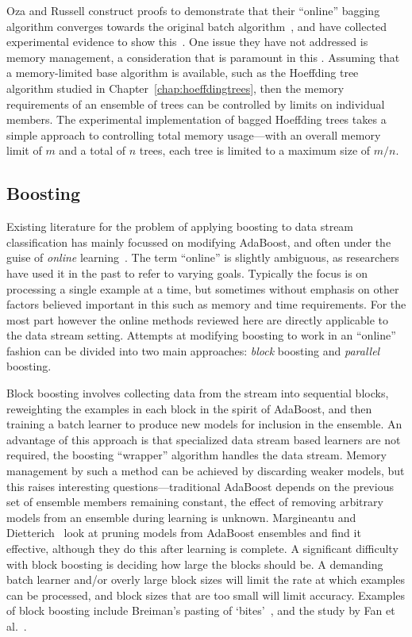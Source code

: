 Oza and Russell construct proofs to demonstrate that their ``online'' bagging algorithm converges towards the original batch algorithm~\cite{ozabagboost}, and have collected experimental evidence to show this~\cite{ozaexp}. One issue they have not addressed is memory management, a consideration that is paramount in this  \thesisc. Assuming that a memory-limited base algorithm is available, such as the Hoeffding tree algorithm studied in Chapter~\ref{chap:hoeffdingtrees}, then the memory requirements of an ensemble of trees can be controlled by limits on individual members. The experimental implementation of bagged Hoeffding trees takes a simple approach to controlling total memory usage---with an overall memory limit of $m$ and a total of $n$ trees, each tree is limited to a maximum size of $m/n$.


\subsection{Boosting} 
\label{sec:boostingstream}

Existing literature for the problem of applying boosting to data stream
classification has mainly focussed on modifying AdaBoost, and often under the guise of {\em online} learning~\cite{ozabagboost, fszboost}. 
The term ``online'' is slightly ambiguous, as researchers have used it in the past to refer to varying goals. Typically the focus is on processing a single example at a time, but sometimes without emphasis on other factors believed important in this \thesis  such as memory and time requirements.
For the most part however the online methods reviewed here are directly applicable to the data stream setting.
Attempts at modifying boosting to work in an ``online'' fashion can be
divided into two main approaches: {\em block} boosting and {\em parallel}
boosting.

Block boosting involves collecting data from the stream into sequential blocks,
reweighting the examples in each block in the spirit of AdaBoost, and then
training a batch learner to produce new models for inclusion in the
ensemble. An advantage of this approach is that specialized data stream
based learners are not required, the boosting ``wrapper'' algorithm
handles the data stream. Memory management by such a method can be
achieved by discarding weaker models, but this raises
interesting questions---traditional AdaBoost depends on the previous set
of ensemble members remaining constant, the effect of removing arbitrary
models from an ensemble during learning is unknown. Margineantu and Dietterich~\cite{pruneboost} look at pruning models from AdaBoost ensembles and find it effective, although they do this after learning is complete. A significant difficulty with block boosting is deciding how large the blocks should be. A demanding batch learner and/or overly large block sizes will limit the rate at which examples can be processed, and block sizes that are too small will limit accuracy.
Examples of block boosting include Breiman's pasting of `bites'~\cite{pastingbites}, and the study by Fan et al.~\cite{fszboost}.

